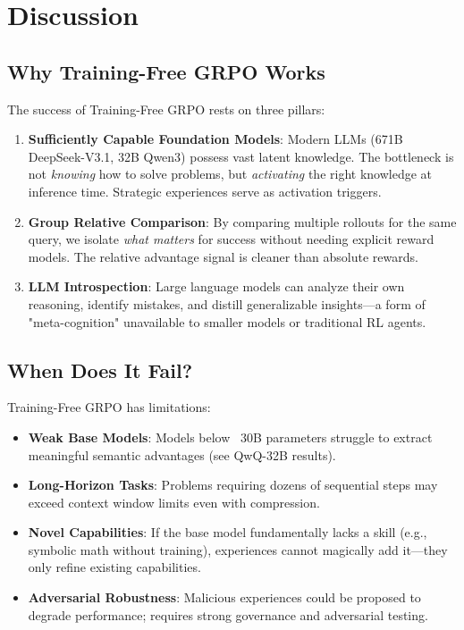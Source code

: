 \documentclass[11pt,a4paper]{article}
\begin{document}
\section{Discussion}

\subsection{Why Training-Free GRPO Works}

The success of Training-Free GRPO rests on three pillars:

\begin{enumerate}
    \item \textbf{Sufficiently Capable Foundation Models}: Modern LLMs (671B DeepSeek-V3.1, 32B Qwen3) possess vast latent knowledge. The bottleneck is not \textit{knowing} how to solve problems, but \textit{activating} the right knowledge at inference time. Strategic experiences serve as activation triggers.

    \item \textbf{Group Relative Comparison}: By comparing multiple rollouts for the same query, we isolate \textit{what matters} for success without needing explicit reward models. The relative advantage signal is cleaner than absolute rewards.

    \item \textbf{LLM Introspection}: Large language models can analyze their own reasoning, identify mistakes, and distill generalizable insights—a form of "meta-cognition" unavailable to smaller models or traditional RL agents.
\end{enumerate}

\subsection{When Does It Fail?}

Training-Free GRPO has limitations:

\begin{itemize}
    \item \textbf{Weak Base Models}: Models below ~30B parameters struggle to extract meaningful semantic advantages (see QwQ-32B results).

    \item \textbf{Long-Horizon Tasks}: Problems requiring dozens of sequential steps may exceed context window limits even with compression.

    \item \textbf{Novel Capabilities}: If the base model fundamentally lacks a skill (e.g., symbolic math without training), experiences cannot magically add it—they only refine existing capabilities.

    \item \textbf{Adversarial Robustness}: Malicious experiences could be proposed to degrade performance; requires strong governance and adversarial testing.
\end{itemize}
\end{document}
